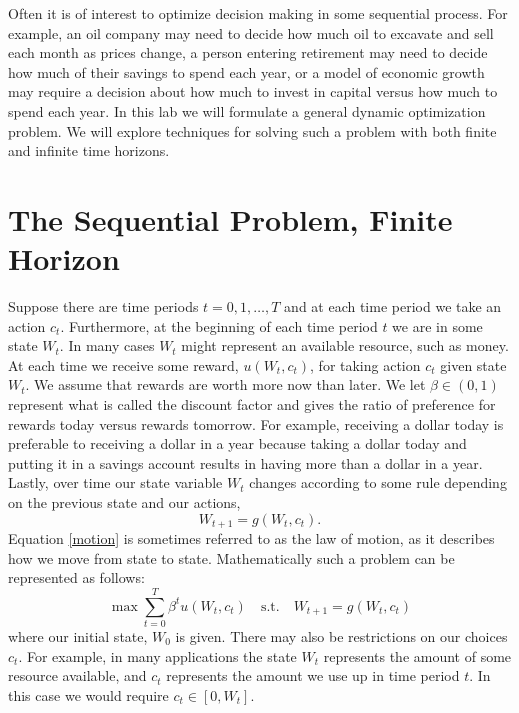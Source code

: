 
Often it is of interest to optimize decision making in some sequential process.  For example, an oil company may need to decide 
how much oil to excavate and sell each month as prices change, a person entering retirement may need to decide how much of their 
savings to spend each year, or a model of economic growth may require a decision about how much to invest in capital versus how 
much to spend each year.  In this lab we will formulate a general dynamic optimization problem.  We will explore techniques for 
solving such a problem with both finite and infinite time horizons.

\section*{The Sequential Problem, Finite Horizon}
Suppose there are time periods $t=0,1,\ldots, T$ and at each time period we take an action $c_t$. Furthermore, at the beginning 
of each time period $t$ we are in some state $W_t$.  In many cases $W_t$ might represent an available resource, such as money.  
At each time we receive some reward, $u(W_t,c_t)$, for taking action $c_t$ given state $W_t$.  We assume that rewards are worth 
more now than later. We let $\beta\in (0,1)$ represent what is called the discount factor and gives the ratio of preference for 
rewards today versus rewards tomorrow.  For example, receiving a dollar today is preferable to receiving a dollar in a year 
because taking a dollar today and putting it in a  savings account results in having more than a dollar in a year.  Lastly, over 
time our state variable $W_t$ changes according to some rule depending on the previous state and our actions,
\begin{equation}
\label{motion}
W_{t+1} = g(W_t,c_t).
\end{equation}
Equation \eqref{motion} is sometimes referred to as the law of motion, as it describes how we move from state to state.
Mathematically such a problem can be represented as follows:
\begin{equation*}
\max \sum_{t=0}^T \beta^t u(W_t,c_t) \quad \text{s.t.} \quad W_{t+1} = g(W_t,c_t)
\end{equation*}
where our initial state, $W_0$ is given.  There may also be restrictions on our choices $c_t$.  For example, in many applications 
the state $W_t$ represents the amount of some resource available, and $c_t$ represents the amount we use up in time period $t$. 
 In this case we would require $c_t \in [0,W_t]$.


